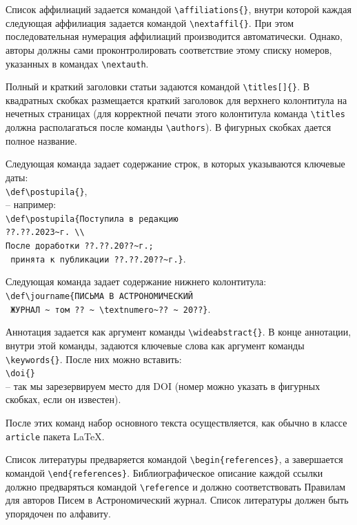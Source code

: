 \documentclass{pazh2col-win}
\begin{document}
 Список аффилиаций задается командой \verb|\affiliations{}|, 
 внутри которой каждая следующая аффилиация задается командой \verb|\nextaffil{}|. 
При этом последовательная нумерация аффилиаций производится автоматически.
Однако, авторы должны сами проконтролировать соответствие этому списку номеров, 
указанных в командах \verb|\nextauth|.

Полный и краткий заголовки статьи задаются командой \verb|\titles[]{}|.
В квадратных скобках размещается краткий заголовок для верхнего колонтитула на нечетных страницах
(для корректной печати этого колонтитула команда \verb|\titles|
 должна располагаться после команды \verb|\authors|).
В фигурных скобках дается полное название.

Следующая команда задает содержание строк, в которых указываются ключевые даты:
\\
\verb|\def\postupila{}|,
\\
-- например:
\\
\verb|\def\postupila{Поступила в редакцию|
\\
\verb|??.??.2023~г. \\ |
\\
\verb|После доработки ??.??.20??~г.;|
\\
\verb| принята к публикации ??.??.20??~г.}|.

Следующая команда задает содержание нижнего колонтитула:
\\
\verb|\def\journame{ПИСЬМА В АСТРОНОМИЧЕСКИЙ|
\\
\verb| ЖУРНАЛ ~ том ?? ~ \textnumero~?? ~ 20??}|.

Аннотация задается как аргумент команды \verb|\wideabstract{}|. 
В конце аннотации, внутри этой команды, задаются ключевые слова 
как аргумент команды \verb|\keywords{}|.
После них можно вставить:
\\
\verb|\doi{}|
\\
-- так мы зарезервируем место для DOI (номер можно указать в фигурных скобках, если он известен).

После этих команд набор основного текста осуществляется, как обычно 
в классе \texttt{article} пакета \LaTeX.

Список литературы предваряется командой \verb|\begin{references}|, 
а завершается командой \verb|\end{references}|.
Библиографическое описание каждой ссылки должно предваряться командой \verb|\reference|
и должно соответствовать Правилам для авторов Писем в Астрономический журнал.
Список литературы должен быть упорядочен по алфавиту.
\end{document}
